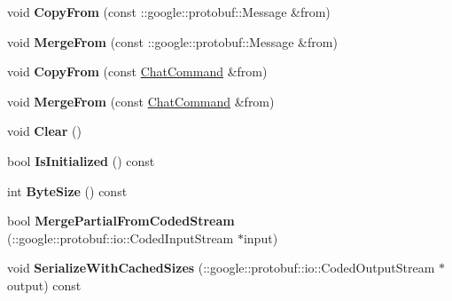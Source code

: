 \begin{DoxyCompactItemize}
\item 
\hypertarget{classSimpleChat_1_1ChatCommand_a87d01f257540ddb198889eb5ac90b9e8}{void {\bfseries Copy\-From} (const \-::google\-::protobuf\-::\-Message \&from)}\label{classSimpleChat_1_1ChatCommand_a87d01f257540ddb198889eb5ac90b9e8}

\item 
\hypertarget{classSimpleChat_1_1ChatCommand_aa58b45138751c053e0064dcccb096a4c}{void {\bfseries Merge\-From} (const \-::google\-::protobuf\-::\-Message \&from)}\label{classSimpleChat_1_1ChatCommand_aa58b45138751c053e0064dcccb096a4c}

\item 
\hypertarget{classSimpleChat_1_1ChatCommand_ae9451f271b99462bfa76a5071a2be90c}{void {\bfseries Copy\-From} (const \hyperlink{classSimpleChat_1_1ChatCommand}{Chat\-Command} \&from)}\label{classSimpleChat_1_1ChatCommand_ae9451f271b99462bfa76a5071a2be90c}

\item 
\hypertarget{classSimpleChat_1_1ChatCommand_aa456dbbffa7e3944bb0c52c439886e03}{void {\bfseries Merge\-From} (const \hyperlink{classSimpleChat_1_1ChatCommand}{Chat\-Command} \&from)}\label{classSimpleChat_1_1ChatCommand_aa456dbbffa7e3944bb0c52c439886e03}

\item 
\hypertarget{classSimpleChat_1_1ChatCommand_a22dd73cd4eb8e470615d8fdc90de3136}{void {\bfseries Clear} ()}\label{classSimpleChat_1_1ChatCommand_a22dd73cd4eb8e470615d8fdc90de3136}

\item 
\hypertarget{classSimpleChat_1_1ChatCommand_abe7098c37325708404ddd6571727b81c}{bool {\bfseries Is\-Initialized} () const }\label{classSimpleChat_1_1ChatCommand_abe7098c37325708404ddd6571727b81c}

\item 
\hypertarget{classSimpleChat_1_1ChatCommand_a22213d9b1e8634eba2e75f36d068db12}{int {\bfseries Byte\-Size} () const }\label{classSimpleChat_1_1ChatCommand_a22213d9b1e8634eba2e75f36d068db12}

\item 
\hypertarget{classSimpleChat_1_1ChatCommand_acc63785a17c5e8f667c3c0287f54a144}{bool {\bfseries Merge\-Partial\-From\-Coded\-Stream} (\-::google\-::protobuf\-::io\-::\-Coded\-Input\-Stream $\ast$input)}\label{classSimpleChat_1_1ChatCommand_acc63785a17c5e8f667c3c0287f54a144}

\item 
\hypertarget{classSimpleChat_1_1ChatCommand_a41bc3d65c65cc85132c8d246eac09123}{void {\bfseries Serialize\-With\-Cached\-Sizes} (\-::google\-::protobuf\-::io\-::\-Coded\-Output\-Stream $\ast$output) const }\label{classSimpleChat_1_1ChatCommand_a41bc3d65c65cc85132c8d246eac09123}


\end{DoxyCompactItemize}

